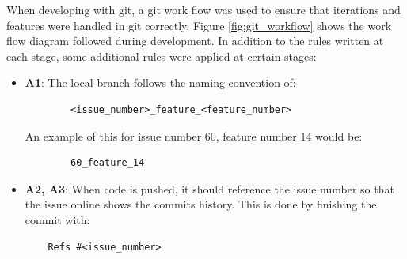 When developing with git, a git work flow was used to ensure that iterations and features were handled in git correctly. Figure \ref{fig:git_workflow} shows the work flow diagram followed during development. In addition to the rules written at each stage, some additional rules were applied at certain stages: 
\begin{itemize}
	\item \textbf{A1}: The local branch follows the naming convention of:
	\begin{verbatim}
		<issue_number>_feature_<feature_number>
	\end{verbatim}
	An example of this for issue number 60, feature number 14 would be:
	\begin{verbatim}
		60_feature_14
	\end{verbatim}
	
	\item \textbf{A2, A3}: When code is pushed, it should reference the issue number so that the issue online shows the commits history. This is done by finishing the commit with:
	\begin{verbatim}
	Refs #<issue_number>
	\end{verbatim}
	
\end{itemize}

\begin{figure}[h!]
\end{figure}